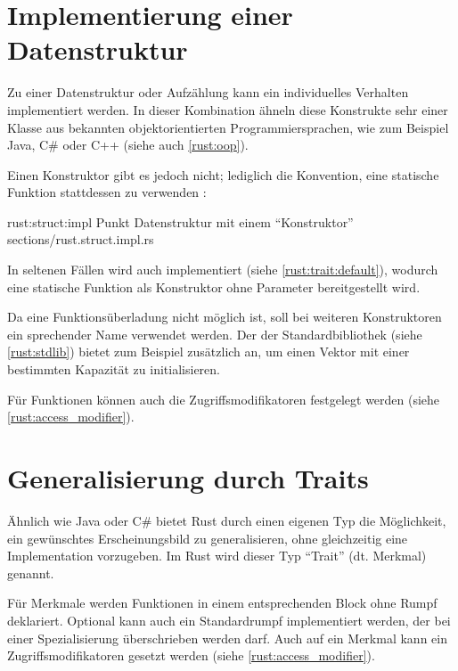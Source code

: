 \section{Implementierung einer Datenstruktur}

Zu einer Datenstruktur oder Aufzählung kann ein individuelles Verhalten implementiert werden.
In dieser Kombination ähneln diese Konstrukte sehr einer Klasse aus bekannten objektorientierten Programmiersprachen, wie zum Beispiel Java, C\# oder C++ (siehe auch \autoref{rust:oop}).

Einen Konstruktor gibt es jedoch nicht; lediglich die Konvention, eine statische Funktion  stattdessen zu verwenden \cite{rust:book:constructors}:

\rustcinclude
	{rust:struct:impl}
	{Punkt Datenstruktur mit einem \enquote{Konstruktor}}
	{sections/rust.struct.impl.rs}
	
In seltenen Fällen wird auch  implementiert (siehe \autoref{rust:trait:default}), wodurch eine statische Funktion  als Konstruktor ohne Parameter bereitgestellt wird.

Da eine Funktionsüberladung nicht möglich ist, soll bei weiteren Konstruktoren ein sprechender Name verwendet werden.
Der  der Standardbibliothek (siehe \autoref{rust:stdlib}) bietet zum Beispiel zusätzlich  an, um einen Vektor mit einer bestimmten Kapazität zu initialisieren.

Für Funktionen können auch die Zugriffsmodifikatoren festgelegt werden (siehe \autoref{rust:access_modifier}). 

\section{Generalisierung durch Traits}
\label{rust:traits}
\label{rust:generics}
\label{rust:trait:default}

Ähnlich wie Java oder C\# bietet Rust durch einen eigenen Typ die Möglichkeit, ein gewünschtes Erscheinungsbild zu generalisieren, ohne gleichzeitig eine Implementation vorzugeben.
Im Rust wird dieser Typ \enquote{Trait} (dt. Merkmal) genannt.

Für Merkmale werden Funktionen in einem entsprechenden  Block ohne Rumpf deklariert.
Optional kann auch ein Standardrumpf implementiert werden, der bei einer Spezialisierung überschrieben werden darf.
Auch auf ein Merkmal kann ein Zugriffsmodifikatoren gesetzt werden (siehe \autoref{rust:access_modifier}).

